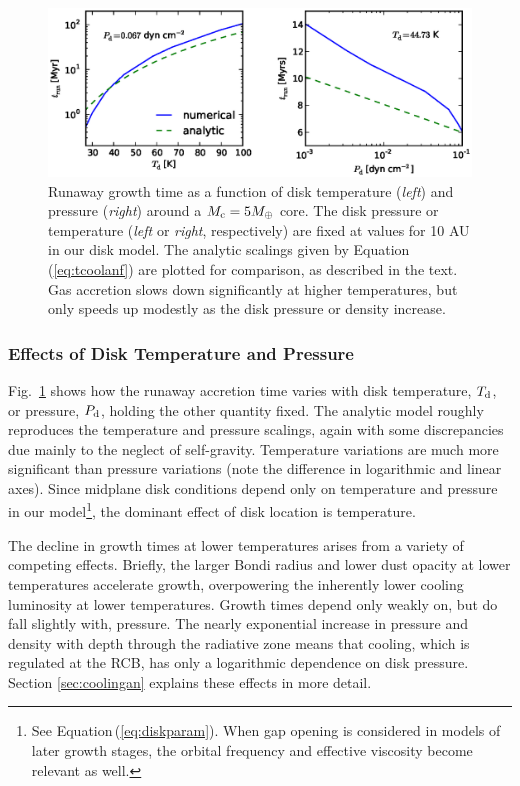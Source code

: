 \documentclass[apj, numberedappendix]{emulateapj}
\newcommand{\Eq}[1]{Equation\,(\ref{#1})}
\newcommand{\Fig}[1]{Fig.~\ref{#1}}
\newcommand{\di}{_{\rm d}}
\begin{document}
\begin{figure}[tb]
\centering
\includegraphics[width=1.\textwidth]{../../figs/ModelAtmospheres/RadSelfGravPoly/PaperFigs/TdPd_effect.eps}
\vspace{-0.3in}
\caption{Runaway growth time as a function of disk temperature (\emph{left}) and pressure (\emph{right}) around a $M_{\rm c} = 5 M_{\oplus}$ core.   The disk pressure or temperature (\emph{left} or \emph{right}, respectively) are fixed at values for 10 AU in our disk model.   The analytic scalings given by \Eq{eq:tcoolanf} are plotted for comparison, as described in the text.  Gas accretion slows down significantly at higher temperatures, but only speeds up modestly as the disk pressure or density increase.} 
\label{fig:TPeffects}
\end{figure}

\subsubsection{Effects of Disk Temperature and Pressure}
\label{sec:TPeffects}

\Fig{fig:TPeffects} shows how the runaway accretion time varies with disk temperature, $T\di$, or pressure, $P\di$, holding the other quantity fixed.   The analytic model roughly reproduces the temperature and pressure scalings, again with some discrepancies due mainly to the neglect of self-gravity.  Temperature variations are much more significant than pressure variations (note the difference in logarithmic and linear axes).  Since midplane disk conditions depend only on temperature and pressure in our model\footnote{See \Eq{eq:diskparam}.  When gap opening is considered in models of later growth stages, the orbital frequency and effective viscosity become relevant as well.}, the dominant effect of disk location is temperature.  

The decline in growth times at lower temperatures arises from a variety of competing effects.  Briefly, the larger Bondi radius and lower dust opacity at lower temperatures accelerate growth, overpowering the inherently lower cooling luminosity at lower temperatures.  Growth times depend only weakly on, but do fall slightly with, pressure.  The nearly exponential increase in pressure and density with depth through the radiative zone means that cooling, which is regulated at the RCB, has only a logarithmic dependence on disk pressure.   Section \ref{sec:coolingan} explains these effects in more detail.
\end{document}
